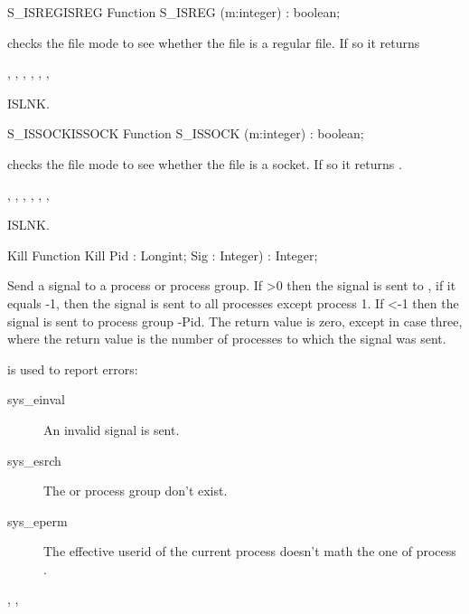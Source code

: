 \html{}
\begin{functionl}{S\_ISREG}{ISREG}
\Declaration
Function S\_ISREG (m:integer) : boolean;

\Description
  checks the file mode  to see whether the file is a
regular file. If so it returns 

\Errors
{},
 , 
 ,
 ,
 ,
 ,

\SeeAlso
ISLNK.
\end{functionl}
\begin{functionl}{S\_ISSOCK}{ISSOCK}
\Declaration
Function S\_ISSOCK (m:integer) : boolean;

\Description
  checks the file mode  to see whether the file is a
socket. If so it returns .

\Errors
{},
 , 
 ,
 ,
 ,
 ,

\SeeAlso
ISLNK.
\end{functionl}
\begin{function}{Kill}
\Declaration
Function Kill Pid : Longint; Sig : Integer) : Integer;

\Description
 Send a signal  to a process or process group. If >0 then
the signal is sent to , if it equals -1, then the signal is sent to
all processes except process 1. If <-1 then the signal is sent to
process group -Pid.
The return value is zero, except in case three, where the return value is the
number of processes to which the signal was sent.

\Errors
{} is used to report errors:
\begin{description}
\item[sys\_einval] An invalid signal is sent.
\item[sys\_esrch] The  or process group don't exist.
\item[sys\_eperm] The effective userid of the current process doesn't math
the one of process .
\end{description}

\SeeAlso
{}, ,  
\end{function}
